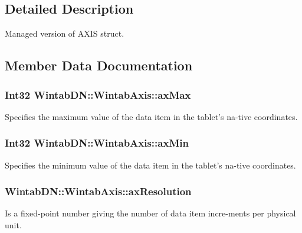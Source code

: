 \subsection{Detailed Description}
Managed version of AXIS struct. 

\subsection{Member Data Documentation}
\hypertarget{struct_wintab_d_n_1_1_wintab_axis_a0f449ce8591349ff40a0aeda1acb406f}{
\subsubsection[{axMax}]{\setlength{\rightskip}{0pt plus 5cm}Int32 {\bf WintabDN::WintabAxis::axMax}}}
\label{struct_wintab_d_n_1_1_wintab_axis_a0f449ce8591349ff40a0aeda1acb406f}


Specifies the maximum value of the data item in the tablet's na-\/tive coordinates. 

\hypertarget{struct_wintab_d_n_1_1_wintab_axis_a03fc660c302fa514b40c5e74a6a4e277}{
\subsubsection[{axMin}]{\setlength{\rightskip}{0pt plus 5cm}Int32 {\bf WintabDN::WintabAxis::axMin}}}
\label{struct_wintab_d_n_1_1_wintab_axis_a03fc660c302fa514b40c5e74a6a4e277}


Specifies the minimum value of the data item in the tablet's na-\/tive coordinates. 

\hypertarget{struct_wintab_d_n_1_1_wintab_axis_ae70c658765a04de55fe6f219cbd832f8}{
\subsubsection[{axResolution}]{ {\bf WintabDN::WintabAxis::axResolution}}}
\label{struct_wintab_d_n_1_1_wintab_axis_ae70c658765a04de55fe6f219cbd832f8}


Is a fixed-\/point number giving the number of data item incre-\/ments per physical unit. 

